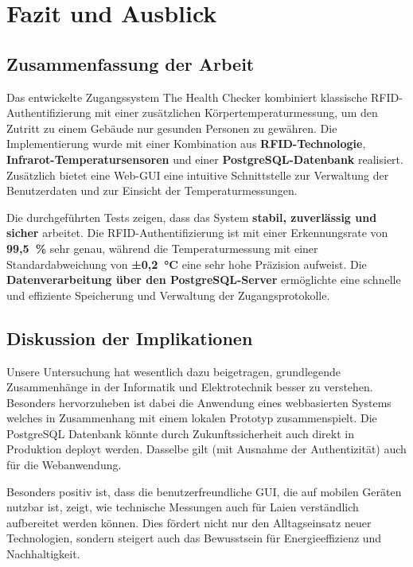 \section{Fazit und Ausblick}
\label{sec:fazit_und_ausblick}

\subsection{Zusammenfassung der Arbeit}


Das entwickelte Zugangssystem The Health Checker kombiniert klassische RFID-Authentifizierung mit einer zusätzlichen Körpertemperaturmessung, um den Zutritt zu einem Gebäude nur gesunden Personen zu gewähren. Die Implementierung wurde mit einer Kombination aus \textbf{RFID-Technologie}, \textbf{Infrarot-Temperatursensoren} und einer \textbf{PostgreSQL-Datenbank} realisiert. Zusätzlich bietet eine Web-GUI eine intuitive Schnittstelle zur Verwaltung der Benutzerdaten und zur Einsicht der Temperaturmessungen.

\vspace{1em}
\noindent Die durchgeführten Tests zeigen, dass das System \textbf{stabil, zuverlässig und sicher} arbeitet. Die RFID-Authentifizierung ist mit einer Erkennungsrate von \textbf{99,5~\%} sehr genau, während die Temperaturmessung mit einer Standardabweichung von \textbf{±0,2~°C} eine sehr hohe Präzision aufweist. Die \textbf{Datenverarbeitung über den PostgreSQL-\-Server} ermöglichte eine schnelle und effiziente Speicherung und Verwaltung der Zugangsprotokolle.

\subsection{Diskussion der Implikationen}

Unsere Untersuchung hat wesentlich dazu beigetragen, grundlegende Zusammenhänge in der Informatik und Elektrotechnik besser zu verstehen. Besonders hervorzuheben ist dabei die Anwendung eines webbasierten Systems welches in Zusammenhang mit einem lokalen Prototyp zusammenspielt. Die PostgreSQL Datenbank könnte durch Zukunftssicherheit auch direkt in Produktion deployt werden. Dasselbe gilt (mit Ausnahme der Authentizität) auch für die Webanwendung.

\vspace{1em}
\noindent Besonders positiv ist, dass die benutzerfreundliche GUI, die auf mobilen Geräten nutzbar ist, zeigt, wie technische Messungen auch für Laien verständlich aufbereitet werden können. Dies fördert nicht nur den Alltagseinsatz neuer Technologien, sondern steigert auch das Bewusstsein für Energieeffizienz und Nachhaltigkeit.

